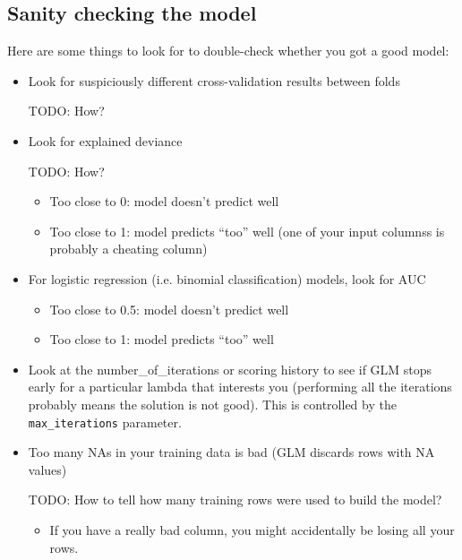 \subsection{Sanity checking the model}

Here are some things to look for to double-check whether you got a good model:

\begin{itemize}
\item Look for suspiciously different cross-validation results between folds

TODO: How?

\item Look for explained deviance

TODO: How?

      \begin{itemize}
      \item Too close to 0:  model doesn’t predict well
      \item Too close to 1:  model predicts “too” well (one of your input columnss is probably a cheating column)
      \end{itemize}
\item For logistic regression (i.e. binomial classification) models, look for AUC
      \begin{itemize}
      \item Too close to 0.5:  model doesn’t predict well
      \item Too close to 1:  model predicts “too” well
      \end{itemize}
\item Look at the number\_of\_iterations or scoring history to see if GLM stops early for a particular
      lambda that interests you (performing all the iterations probably means the solution is not good).  This is
      controlled by the \texttt{max\_iterations} parameter.
\item Too many NAs in your training data is bad (GLM discards rows with NA values)

TODO: How to tell how many training rows were used to build the model?

      \begin{itemize}
      \item If you have a really bad column, you might accidentally be losing all your rows.
      \end{itemize}
\end{itemize}



